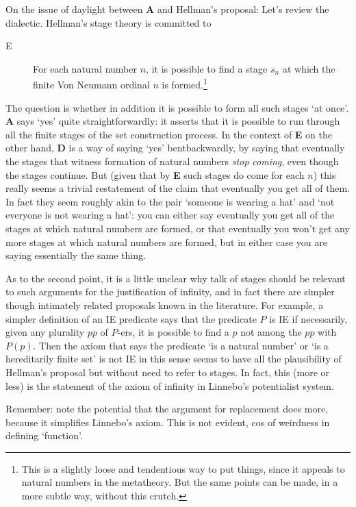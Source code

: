 \documentclass{asl}
\theoremstyle{definition}
\begin{document}
On the issue of daylight between {\bf A} and Hellman's proposal: 
Let's review the dialectic. Hellman's stage theory is committed to 

\begin{description} 
    \item[E] For each natural number $n$, 
    it is possible to find a stage $s_n$ at which the 
    finite Von Neumann ordinal $n$ is formed.\footnote{
        This is a slightly loose and tendentious way to put things,
        since it appeals to natural numbers in the metatheory. But
        the same points can be made, in a more subtle way, without
        this crutch.
    }
\end{description} 
The question is whether in addition it is possible to form 
all such stages `at once'. {\bf A} says `yes' quite straightforwardly: 
it asserts that it is possible to run through all the finite stages 
of the set construction process. In the context of {\bf E} on the other hand, 
{\bf D} is a way of saying `yes' bentbackwardly, by saying that eventually 
the stages that witness formation of natural numbers \emph{stop coming}, 
even though the stages continue. But (given that by {\bf E} such stages 
do come for each $n$) this really seems a trivial restatement of the 
claim that eventually you get all of them.  In fact they seem roughly akin 
to the pair `someone is wearing a hat' and `not everyone is not wearing a hat': 
you can either say eventually you get all of the stages at which natural numbers 
are formed, or that eventually you won't get any more stages at which natural 
numbers are formed, but in either case you are saying essentially the same thing.

As to the second point, it is a little unclear why talk of stages 
should be relevant to such arguments for the justification of infinity, 
and in fact there are simpler though intimately related proposals known 
in the literature. For example, a simpler definition of an IE predicate says 
that the predicate $P$ is IE if necessarily, given any plurality $pp$ of $P$-ers, 
it is possible to find a $p$ not among the $pp$ with $P(p)$. 
Then the axiom that says the predicate `is a natural number' or 
`is a hereditarily finite set' is not IE in this sense seems to have 
all the plausibility of Hellman's proposal but without need to refer to stages. 
In fact, this (more or less) is the statement of the axiom of infinity in 
Linnebo's potentialist system.

Remember: note the potential that the argument for replacement does more,
because it simplifies Linnebo's axiom. This is not evident, 
cos of weirdness in defining `function'.
\end{document}
